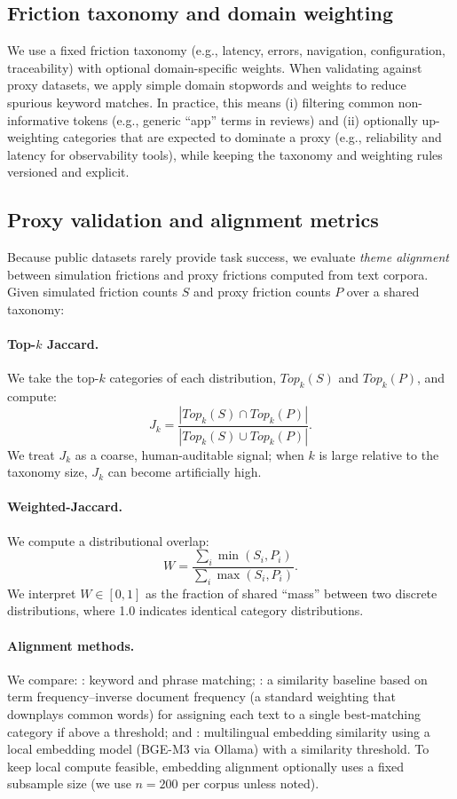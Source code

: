 \subsection{Friction taxonomy and domain weighting}
We use a fixed friction taxonomy (e.g., latency, errors, navigation, configuration, traceability) with optional domain-specific weights.
When validating against proxy datasets, we apply simple domain stopwords and weights to reduce spurious keyword matches.
In practice, this means (i) filtering common non-informative tokens (e.g., generic ``app'' terms in reviews) and
(ii) optionally up-weighting categories that are expected to dominate a proxy (e.g., reliability and latency for observability tools),
while keeping the taxonomy and weighting rules versioned and explicit.

\subsection{Proxy validation and alignment metrics}
Because public datasets rarely provide task success, we evaluate \emph{theme alignment} between simulation frictions
and proxy frictions computed from text corpora.
Given simulated friction counts $S$ and proxy friction counts $P$ over a shared taxonomy:

\paragraph{Top-$k$ Jaccard.}
We take the top-$k$ categories of each distribution, $Top_k(S)$ and $Top_k(P)$, and compute:
\[
J_k = \frac{|Top_k(S) \cap Top_k(P)|}{|Top_k(S) \cup Top_k(P)|}.
\]
We treat $J_k$ as a coarse, human-auditable signal; when $k$ is large relative to the taxonomy size, $J_k$ can become artificially high.

\paragraph{Weighted-Jaccard.}
We compute a distributional overlap:
\[
W = \frac{\sum_i \min(S_i, P_i)}{\sum_i \max(S_i, P_i)}.
\]
We interpret $W \in [0, 1]$ as the fraction of shared ``mass'' between two discrete distributions, where 1.0 indicates identical category distributions.

\paragraph{Alignment methods.}
We compare:
\MethodLex: keyword and phrase matching;
\MethodTFIDF: a similarity baseline based on term frequency--inverse document frequency (a standard weighting that downplays common words) for assigning each text to a single best-matching category if above a threshold; and
\MethodEmbed: multilingual embedding similarity using a local embedding model (BGE-M3 via Ollama) with a similarity threshold.
To keep local compute feasible, embedding alignment optionally uses a fixed subsample size (we use $n=200$ per corpus unless noted).

